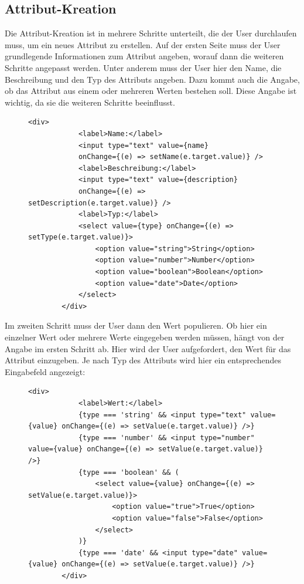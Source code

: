 \subsection{Attribut-Kreation}
Die Attribut-Kreation ist in mehrere Schritte unterteilt, die der User durchlaufen muss, um ein neues Attribut zu erstellen.
Auf der ersten Seite muss der User grundlegende Informationen zum Attribut angeben, worauf dann die weiteren Schritte angepasst werden.
Unter anderem muss der User hier den Name, die Beschreibung und den Typ des Attributs angeben. Dazu kommt auch die Angabe, ob das Attribut aus einem oder mehreren 
Werten bestehen soll. Diese Angabe ist wichtig, da sie die weiteren Schritte beeinflusst.
\begin{figure}[H]
    \begin{lstlisting}[caption=Attribut-Kreation, label=list:attributeCreation]
        <div>
            <label>Name:</label>
            <input type="text" value={name} 
            onChange={(e) => setName(e.target.value)} />
            <label>Beschreibung:</label>
            <input type="text" value={description} 
            onChange={(e) => setDescription(e.target.value)} />
            <label>Typ:</label>
            <select value={type} onChange={(e) => setType(e.target.value)}>
                <option value="string">String</option>
                <option value="number">Number</option>
                <option value="boolean">Boolean</option>
                <option value="date">Date</option>
            </select>
        </div>
    \end{lstlisting}
\end{figure}
Im zweiten Schritt muss der User dann den Wert populieren. Ob hier ein einzelner Wert oder mehrere Werte eingegeben werden müssen, hängt von der Angabe im ersten Schritt ab.
Hier wird der User aufgefordert, den Wert für das Attribut einzugeben. Je nach Typ des Attributs wird hier ein entsprechendes Eingabefeld angezeigt:
\begin{figure}[H]
    \begin{lstlisting}[caption=Attribut-Kreation, label=list:attributeCreation2]
        <div>
            <label>Wert:</label>
            {type === 'string' && <input type="text" value={value} onChange={(e) => setValue(e.target.value)} />}
            {type === 'number' && <input type="number" value={value} onChange={(e) => setValue(e.target.value)} />}
            {type === 'boolean' && (
                <select value={value} onChange={(e) => setValue(e.target.value)}>
                    <option value="true">True</option>
                    <option value="false">False</option>
                </select>
            )}
            {type === 'date' && <input type="date" value={value} onChange={(e) => setValue(e.target.value)} />}
        </div>
    \end{lstlisting}
\end{figure}
